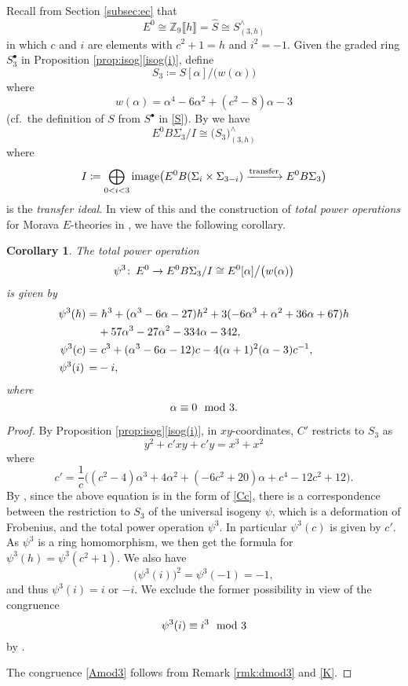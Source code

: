 \documentclass{gtpart}
\newtheorem{cor}[thm]{Corollary}
\theoremstyle{definition}
\theoremstyle{remark}
\def\co{\colon\thinspace}
\newcommand{\mb}[1]{\mathbb{#1}}
\newcommand{\BZ}{{\mb Z}}
\newcommand{\HS}{\widehat{S}}
\newcommand{\md}{~~{\rm mod}~}
\newcommand{\A}{\alpha}
\newcommand{\p}{\psi^3}
\newcommand{\s}{S^\bullet}
\newcommand{\isog}[1]{Proposition \ref{prop:isog}\thinspace \eqref{isog(#1)}}
\begin{document}
Recall from Section \ref{subsec:ec} that 
\[
 E^0 \cong \BZ_9 \llbracket h \rrbracket = \HS \cong S_{(3,h)}^\wedge 
\]
in which $c$ and $i$ are elements with $c^2 + 1 = h$ and $i^2 = -1$.  
Given the graded ring $\s_3$ in \isog{i}, define 
\begin{equation}
\label{S_3}
 S_3 \coloneqq S [\A] / \big( w(\A) \big) 
\end{equation}
where 
\begin{equation}
\label{w}
 w(\A) = \A^4 - 6 \A^2 + (c^2 - 8) \A - 3 
\end{equation}
(cf.~the definition of $S$ from $\s$ in \eqref{S}).  By 
\cite[Theorem 1.1]{Str98} we have 
\[
 E^0 B\Sigma_3 / I \cong \big( S_3 \big)_{(3,h)}^\wedge 
\]
where 
\begin{equation}
\label{transfer}
 I \coloneqq \bigoplus_{0<i<3} {\rm image} \big( E^0 B(\Sigma_i \times \Sigma_{3-i}) \xrightarrow{\rm transfer} E^0 B\Sigma_3 \big) 
\end{equation}
is the {\em transfer ideal}.  
In view of this and the construction of {\em total power operations} for 
Morava $E$-theories in \cite[3.23]{cong}, we have the following 
corollary.  
\begin{cor}
\label{cor:psi3}
 The total power operation 
 \[
  \p \co E^0 \to E^0 B\Sigma_3 / I \cong E^0 [\A] \big/ \big( w(\A) \big) 
 \]
 is given by 
 \begin{equation*}
 \begin{split}
  \p(h) = & ~ h^3 + (\A^3 - 6 \A - 27) h^2 + 3 (-6 \A^3 + \A^2 + 36 \A + 67) h \\
          & + 57 \A^3 - 27 \A^2 - 334 \A - 342, \\
  \p(c) = & ~ c^3 + (\A^3 - 6 \A - 12) c - 4 (\A + 1)^2 (\A - 3) c^{-1}, \\
  \p(i) \thinspace = & -i, 
 \end{split}
 \end{equation*}
 where 
 \begin{equation}
 \label{Amod3}
  \A \equiv 0 \md 3.  
 \end{equation}
\end{cor}
\begin{proof}
 By \isog{i}, in $xy$-coordinates, $C'$ restricts to $S_3$ as 
 \[
  y^2 + c' x y + c' y = x^3 + x^2 
 \]
 where 
 \[
  c' = \frac{1}{c} \big( (c^2 - 4) \A^3 + 4 \A^2 + (-6 c^2 + 20) \A + c^4 - 12 c^2 + 12 \big).  
 \]
 By \cite[Theorem B]{cong}, since the above equation is in the form of 
 \eqref{Cc}, there is a correspondence between the restriction to $S_3$ 
 of the universal isogeny $\psi$, which is a deformation of Frobenius, 
 and the total power operation $\p$.  In particular $\p(c)$ is given by 
 $c'$.  As $\p$ is a ring homomorphism, we then get the formula for 
 $\p(h) = \p(c^2 + 1)$.  We also have 
 \[
  \big( \p(i) \big)^2 = \p(-1) = -1, 
 \]
 and thus $\p(i) = i$ or $-i$.  We exclude the former possibility in 
 view of the congruence 
 \[
  \p(i) \equiv i^3 \md 3 
 \]
 by \cite[Propositions 3.25 and 10.5]{cong}.  

 The congruence \eqref{Amod3} follows from Remark \ref{rmk:dmod3} and 
 \eqref{K}.  
\end{proof}
\end{document}
